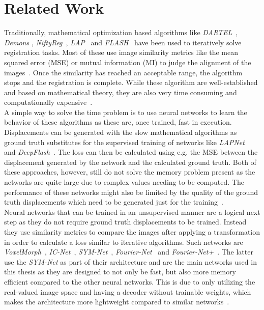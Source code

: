 \section{Related Work} \label{Sec:RelatedWork}
Traditionally, mathematical optimization based algorithms like \emph{DARTEL}~\cite{DARTEL}, \emph{Demons} \cite{Vercauteren2009}, \emph{NiftyReg}~\cite{NiftiReg}, \emph{LAP}~\cite{LAP} and \emph{FLASH}~\cite{FLASH} have been used to iteratively solve registration tasks. Most of these use image similarity metrics like the mean squared error (MSE) or mutual information (MI) to judge the alignment of the images~\cite{Fu2020}. Once the similarity has reached an acceptable range, the algorithm stops and the registration is complete. While these algorithm are well-established and based on mathematical theory, they are also very time consuming and computationally expensive~\cite{Chen2023}.\\
A simple way to solve the time problem is to use neural networks to learn the behavior of these algorithms as these are, once trained, fast in execution. Displacements can be generated with the slow mathematical algorithms as ground truth substitutes for the supervised training of networks like \emph{LAPNet}~\cite{LAPNet} and \emph{DeepFlash}~\cite{DeepFlash}. The loss can then be calculated using e.g. the MSE between the displacement generated by the network and the calculated ground truth. Both of these approaches, however, still do not solve the memory problem present as the networks are quite large due to complex values needing to be computed. The performance of these networks might also be limited by the quality of the ground truth displacements which need to be generated just for the training~\cite{Chen2020,Zou2022}.\\
Neural networks that can be trained in an unsupervised manner are a logical next step as they do not require ground truth displacements to be trained. Instead they use similarity metrics to compare the images after applying a transformation in order to calculate a loss similar to iterative algorithms. Such networks are \emph{VoxelMorph}~\cite{Voxelmorph}, \emph{IC-Net}~\cite{IC-Net}, \emph{SYM-Net}~\cite{SYM-Net}, \emph{Fourier-Net}~\cite{Fourier-Net} and \emph{Fourier-Net+}~\cite{Fourier-Net+}. The latter use the \emph{SYM-Net} as part of their architecture and are the main networks used in this thesis as they are designed to not only be fast, but also more memory efficient compared to the other neural networks. This is due to only utilizing the real-valued image space and having a decoder without trainable weights, which makes the architecture more lightweight compared to similar networks~\cite{Fourier-Net,Fourier-Net+}.\\
